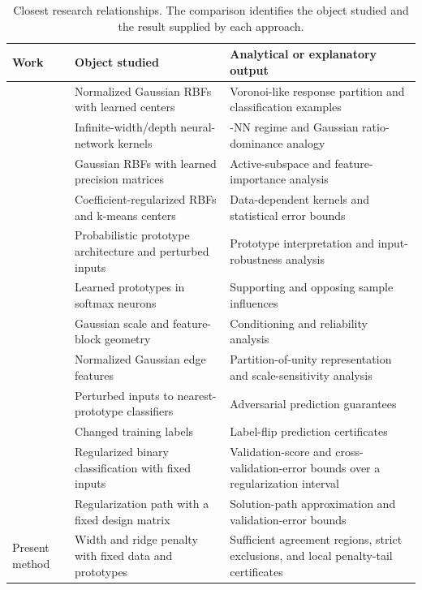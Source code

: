 \documentclass[preprint,12pt,authoryear]{elsarticle}
\begin{document}
\begin{table}[!htbp]
\centering\small
\caption{Closest research relationships. The comparison identifies the object studied and the result supplied by each approach.}
\label{tab:prior}
\begin{tabularx}{\textwidth}{@{}>{\raggedright\arraybackslash}p{}>{\raggedright\arraybackslash}X>{\raggedright\arraybackslash}X@{}}
\toprule
Work & Object studied & Analytical or explanatory output \\
\midrule
\citet{bugmann1998} & Normalized Gaussian RBFs with learned centers & Voronoi-like response partition and classification examples \\
\citet{radhakrishnan2023} & Infinite-width/depth neural-network kernels & 1-NN regime and Gaussian ratio-dominance analogy \\
\citet{dagostino2024} & Gaussian RBFs with learned precision matrices & Active-subspace and feature-importance analysis \\
\citet{que2016} & Coefficient-regularized RBFs and k-means centers & Data-dependent kernels and statistical error bounds \\
\citet{saralajew2025} & Probabilistic prototype architecture and perturbed inputs & Prototype interpretation and input-robustness analysis \\
\citet{fazaeli2026} & Learned prototypes in softmax neurons & Supporting and opposing sample influences \\
\citet{noorizadegan2026reliable} & Gaussian scale and feature-block geometry & Conditioning and reliability analysis \\
\citet{noorizadegan2026partition} & Normalized Gaussian edge features & Partition-of-unity representation and scale-sensitivity analysis \\
\citet{voracek2022} & Perturbed inputs to nearest-prototype classifiers & Adversarial prediction guarantees \\
\citet{rosenfeld2020} & Changed training labels & Label-flip prediction certificates \\
\citet{shibagaki2015} & Regularized binary classification with fixed inputs & Validation-score and cross-validation-error bounds over a regularization interval \\
\citet{ndiaye2019} & Regularization path with a fixed design matrix & Solution-path approximation and validation-error bounds \\
Present method & Width and ridge penalty with fixed data and prototypes & Sufficient agreement regions, strict exclusions, and local penalty-tail certificates \\
\bottomrule
\end{tabularx}
\end{table}
\end{document}
